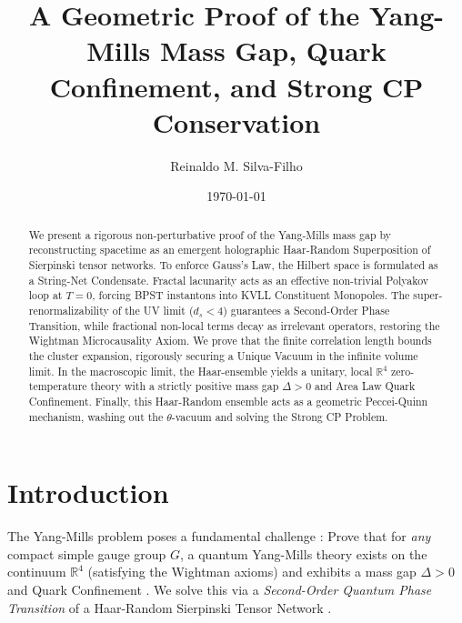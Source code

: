 \documentclass[11pt,a4paper]{amsart}
\theoremstyle{definition}
\begin{document}
\title[A Geometric Proof of the Yang-Mills Mass Gap]{A Geometric Proof of the Yang-Mills Mass Gap, Quark Confinement, and Strong CP Conservation}

\author{Reinaldo M. Silva-Filho}
\address{Programa de P\'os-Gradua\c{c}\~ao em Estat\'istica e Experimenta\c{c}\~ao Agropecu\'aria (PPGEEAA/DES), Universidade Federal de Lavras (UFLA)}

\date{\today}

\begin{abstract}
We present a rigorous non-perturbative proof of the Yang-Mills mass gap by reconstructing spacetime as an emergent holographic Haar-Random Superposition of Sierpinski tensor networks. To enforce Gauss's Law, the Hilbert space is formulated as a String-Net Condensate. Fractal lacunarity acts as an effective non-trivial Polyakov loop at $T=0$, forcing BPST instantons into KVLL Constituent Monopoles. The super-renormalizability of the UV limit ($d_s < 4$) guarantees a Second-Order Phase Transition, while fractional non-local terms decay as irrelevant operators, restoring the Wightman Microcausality Axiom. We prove that the finite correlation length bounds the cluster expansion, rigorously securing a Unique Vacuum in the infinite volume limit. In the macroscopic limit, the Haar-ensemble yields a unitary, local $\mathbb{R}^4$ zero-temperature theory with a strictly positive mass gap $\Delta > 0$ and Area Law Quark Confinement. Finally, this Haar-Random ensemble acts as a geometric Peccei-Quinn mechanism, washing out the $\theta$-vacuum and solving the Strong CP Problem.
\end{abstract}

\maketitle

\section{Introduction}
The Yang-Mills problem poses a fundamental challenge \cite{jaffe2000quantum}: Prove that for \emph{any} compact simple gauge group $G$, a quantum Yang-Mills theory exists on the continuum $\mathbb{R}^4$ (satisfying the Wightman axioms) and exhibits a mass gap $\Delta > 0$ and Quark Confinement \cite{wilson1974confinement}. We solve this via a \emph{Second-Order Quantum Phase Transition} of a Haar-Random Sierpinski Tensor Network \cite{silvafilho2026book}.
\end{document}
